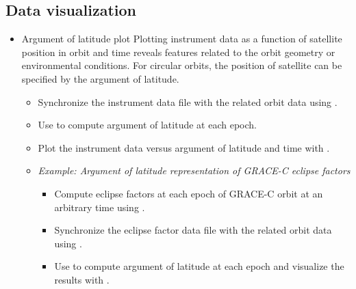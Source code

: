 \subsection{Data visualization}
\begin{itemize}
\item Argument of latitude plot
Plotting instrument data as a function of satellite position in orbit and time reveals features related to the orbit geometry or environmental conditions. For circular orbits, the position of  satellite can be specified by the argument of latitude.
\begin{itemize}
\item Synchronize the instrument data file with the related orbit data using .
\item Use  to compute argument of latitude at each epoch.
\item Plot the instrument data versus argument of latitude and time with .
\item \emph{Example: Argument of latitude representation of GRACE-C eclipse factors}
  \begin{itemize}
  \item Compute eclipse factors at each epoch of GRACE-C orbit at an arbitrary time using .
  \item Synchronize the eclipse factor data file with the related orbit data using .
  \item Use  to compute argument of latitude at each epoch and visualize the results with .
  \end{itemize}
\end{itemize}


\end{itemize}

